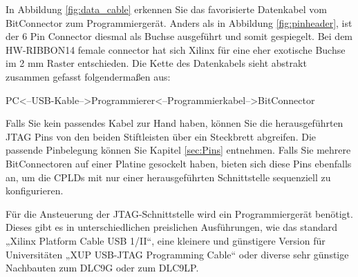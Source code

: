 \documentclass{article}
\begin{document}
In Abbildung \ref{fig:data_cable} erkennen Sie das favorisierte Datenkabel vom BitConnector zum Programmiergerät. Anders als in Abbildung \ref{fig:pinheader}, ist der 6 Pin Connector diesmal als Buchse ausgeführt und somit gespiegelt. Bei dem HW-RIBBON14 female connector hat sich Xilinx für eine eher exotische Buchse im 2 mm Raster entschieden. Die Kette des Datenkabels sieht abstrakt zusammen gefasst folgendermaßen aus:
\vspace{0.5cm}
\begin{center}
	PC<--USB-Kable-->Programmierer<--Programmierkabel-->BitConnector
\end{center}

\vspace{0.5cm}

Falls Sie kein passendes Kabel zur Hand haben, können Sie die herausgeführten JTAG Pins von den beiden Stiftleisten über ein Steckbrett abgreifen. Die passende Pinbelegung können Sie Kapitel \ref{sec:Pins} entnehmen.
Falls Sie mehrere BitConnectoren auf einer Platine gesockelt haben, bieten sich diese Pins ebenfalls an, um die CPLDs mit nur einer herausgeführten Schnittstelle sequenziell zu konfigurieren.


Für die Ansteuerung der JTAG-Schnittstelle wird ein Programmiergerät benötigt. Dieses gibt es in unterschiedlichen preislichen Ausführungen, wie das standard „Xilinx Platform Cable USB 1/II“, eine kleinere und günstigere Version für Universitäten „XUP USB-JTAG Programming Cable“ oder diverse sehr günstige Nachbauten zum DLC9G oder zum DLC9LP. 





\newpage
\printbibliography
\end{document}
